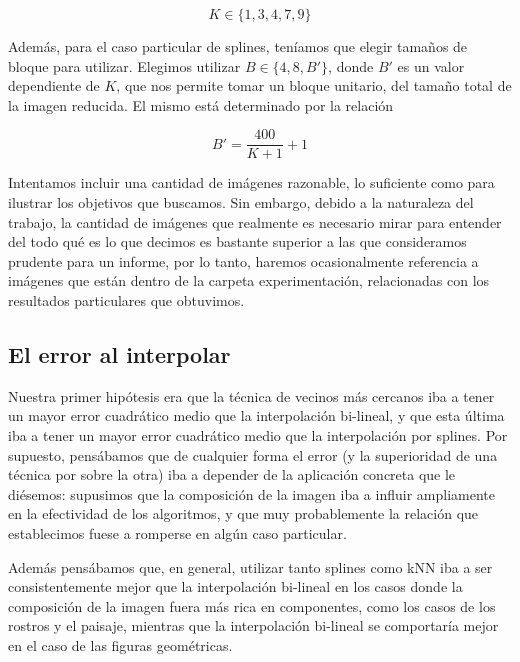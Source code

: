 \documentclass{article}
\begin{document}
$$K \in \{1, 3, 4, 7, 9\}$$

Además, para el caso particular de splines, teníamos que elegir tamaños de bloque para utilizar. Elegimos utilizar $B \in \{4, 8, B'\}$, donde $B'$ es un valor dependiente de $K$, que nos permite tomar un bloque unitario, del tamaño total de la imagen reducida. El mismo está determinado por la relación

$$B' = \frac{400}{K+1} + 1$$


Intentamos incluir una cantidad de imágenes razonable, lo suficiente como para ilustrar los objetivos que buscamos. Sin embargo, debido a la naturaleza del trabajo, la cantidad de imágenes que realmente es necesario mirar para entender del todo qué es lo que decimos es bastante superior a las que consideramos prudente para un informe, por lo tanto, haremos ocasionalmente referencia a imágenes que están dentro de la carpeta experimentación, relacionadas con los resultados particulares que obtuvimos. 

\subsection{El error al interpolar}

Nuestra primer hipótesis era que la técnica de vecinos más cercanos iba a tener un mayor error cuadrático medio que la interpolación bi-lineal, y que esta última iba a tener un mayor error cuadrático medio que la interpolación por splines. Por supuesto, pensábamos que de cualquier forma el error (y la superioridad de una técnica por sobre la otra) iba a depender de la aplicación concreta que le diésemos: supusimos que la composición de la imagen iba a influir ampliamente en la efectividad de los algoritmos, y que muy probablemente la relación que establecimos fuese a romperse en algún caso particular.

Además pensábamos que, en general, utilizar tanto splines como kNN iba a ser consistentemente mejor que la interpolación bi-lineal en los casos donde la composición de la imagen fuera más rica en componentes, como los casos de los rostros y el paisaje, mientras que la interpolación bi-lineal se comportaría mejor en el caso de las figuras geométricas.
\end{document}
